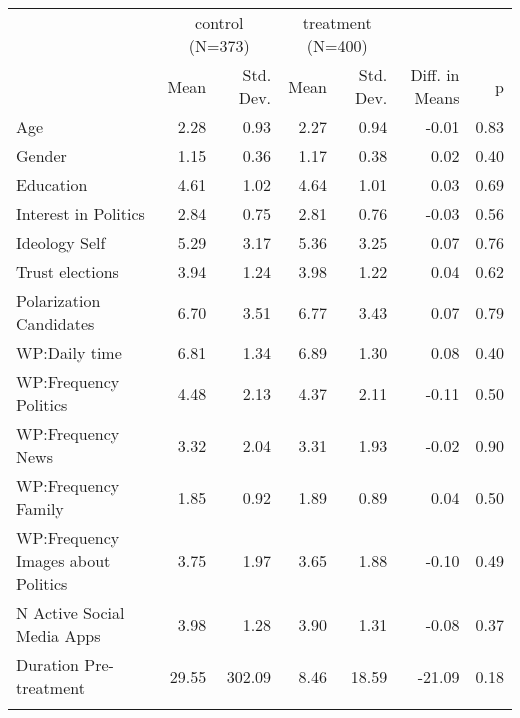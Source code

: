 \begin{table}

\caption{}
\centering
\begin{tabular}[t]{lrrrrrr}
\toprule
\multicolumn{1}{c}{ } & \multicolumn{2}{c}{control (N=373)} & \multicolumn{2}{c}{treatment (N=400)} & \multicolumn{2}{c}{ } \\
\cmidrule(l{3pt}r{3pt}){2-3} \cmidrule(l{3pt}r{3pt}){4-5}
  & Mean & Std. Dev. & Mean & Std. Dev. & Diff. in Means & p\\
\midrule
Age & 2.28 & 0.93 & 2.27 & 0.94 & -0.01 & 0.83\\
Gender & 1.15 & 0.36 & 1.17 & 0.38 & 0.02 & 0.40\\
Education & 4.61 & 1.02 & 4.64 & 1.01 & 0.03 & 0.69\\
Interest in Politics & 2.84 & 0.75 & 2.81 & 0.76 & -0.03 & 0.56\\
Ideology Self & 5.29 & 3.17 & 5.36 & 3.25 & 0.07 & 0.76\\
Trust elections & 3.94 & 1.24 & 3.98 & 1.22 & 0.04 & 0.62\\
Polarization Candidates & 6.70 & 3.51 & 6.77 & 3.43 & 0.07 & 0.79\\
WP:Daily time & 6.81 & 1.34 & 6.89 & 1.30 & 0.08 & 0.40\\
WP:Frequency Politics & 4.48 & 2.13 & 4.37 & 2.11 & -0.11 & 0.50\\
WP:Frequency News & 3.32 & 2.04 & 3.31 & 1.93 & -0.02 & 0.90\\
WP:Frequency Family & 1.85 & 0.92 & 1.89 & 0.89 & 0.04 & 0.50\\
WP:Frequency Images about Politics & 3.75 & 1.97 & 3.65 & 1.88 & -0.10 & 0.49\\
N Active Social Media Apps & 3.98 & 1.28 & 3.90 & 1.31 & -0.08 & 0.37\\
Duration Pre-treatment & 29.55 & 302.09 & 8.46 & 18.59 & -21.09 & 0.18\\
\bottomrule
\multicolumn{7}{l}{\rule{0pt}{1em}}\\
\end{tabular}
\end{table}
